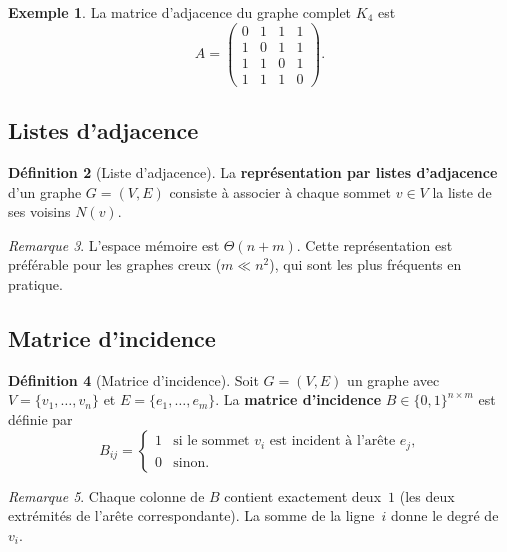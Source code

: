 \documentclass[12pt,a4paper,openany]{book}
\theoremstyle{definition}
\newtheorem{definition}{Définition}[chapter]
\newtheorem{exemple}[definition]{Exemple}
\theoremstyle{plain}
\theoremstyle{remark}
\newtheorem{remarque}[definition]{Remarque}
\begin{document}
\begin{exemple}
\label{ex:matrice-adj-K4}
La matrice d'adjacence du graphe complet $K_4$ est
\[
  A = \begin{pmatrix}
    0 & 1 & 1 & 1 \\
    1 & 0 & 1 & 1 \\
    1 & 1 & 0 & 1 \\
    1 & 1 & 1 & 0
  \end{pmatrix}.
\]
\end{exemple}

\subsection{Listes d'adjacence}
\label{subsec:listes-adj}

\begin{definition}[Liste d'adjacence]
\label{def:liste-adj}
La \textbf{représentation par listes d'adjacence} d'un graphe $G = (V, E)$
consiste à associer à chaque sommet $v \in V$ la liste de ses voisins $N(v)$.
\end{definition}

\begin{remarque}
L'espace mémoire est $\Theta(n + m)$. Cette représentation est préférable pour
les graphes creux ($m \ll n^2$), qui sont les plus fréquents en pratique.
\end{remarque}

\subsection{Matrice d'incidence}
\label{subsec:matrice-inc}

\begin{definition}[Matrice d'incidence]
\label{def:matrice-inc}
Soit $G = (V, E)$ un graphe avec $V = \{v_1, \ldots, v_n\}$ et
$E = \{e_1, \ldots, e_m\}$. La \textbf{matrice d'incidence} $B \in \{0,1\}^{n \times m}$
est définie par
\[
  B_{ij} = \begin{cases} 1 & \text{si le sommet $v_i$ est incident à l'arête $e_j$,} \\
    0 & \text{sinon.}
  \end{cases}
\]
\end{definition}

\begin{remarque}
Chaque colonne de $B$ contient exactement deux~$1$ (les deux extrémités de
l'arête correspondante). La somme de la ligne~$i$ donne le degré de~$v_i$.
\end{remarque}
\end{document}
